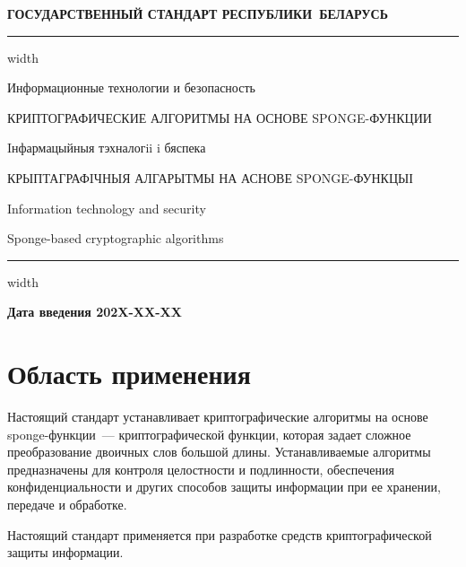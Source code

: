 \newpage
\setcounter{page}{1}
\pagestyle{headings}

\begin{center}
{\bfseries
ГОСУДАРСТВЕННЫЙ СТАНДАРТ РЕСПУБЛИКИ~БЕЛАРУСЬ
\vskip 2pt
\hrule width\textwidth

\vskip 9pt

Информационные технологии и безопасность

КРИПТОГРАФИЧЕСКИЕ АЛГОРИТМЫ НА ОСНОВЕ SPONGE-ФУНКЦИИ

\vskip 9pt

Iнфармацыйныя тэхналогii i бяспека

КРЫПТАГРАФIЧНЫЯ АЛГАРЫТМЫ НА АСНОВЕ SPONGE-ФУНКЦЫІ
} %

\vskip 9pt

Information technology and security

Sponge-based cryptographic algorithms

\vskip 4pt                
\hrule width \textwidth
\end{center}

\mbox{}\hfill{\bfseries Дата введения 202X-XX-XX}

\chapter{Область применения}

Настоящий стандарт устанавливает криптографические алгоритмы на основе
sponge-функции~--- криптографической функции, которая задает сложное 
преобразование двоичных слов большой длины. Устанавливаемые алгоритмы 
предназначены для контроля целостности и подлинности, обеспечения 
конфиденциальности и других способов защиты информации при ее хранении, 
передаче и обработке.

Настоящий стандарт применяется при разработке 
средств криптографической защиты информации.

